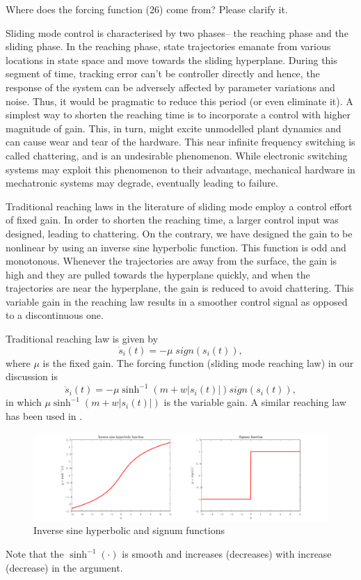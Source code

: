 \documentclass[10pt]{article}
\begin{document}
\begin{response}{Where does the forcing function (26) come from? Please clarify it.}

Sliding mode control is characterised by two phases-- the reaching phase and the sliding phase. In the reaching phase, state trajectories emanate from various locations in state space and move towards the sliding hyperplane. During this segment of time, tracking error can't be controller directly and hence, the response of the system can be adversely affected by parameter variations and noise. Thus, it would be pragmatic to reduce this period (or even eliminate it). A simplest way to shorten the reaching time is to incorporate a control with higher magnitude of gain. This, in turn, might excite unmodelled plant dynamics and can cause wear and tear of the hardware. This near infinite frequency switching is called chattering, and is an undesirable phenomenon. While electronic switching systems may exploit this phenomenon to their advantage, mechanical hardware in mechatronic systems may degrade, eventually leading to failure. 

Traditional reaching laws in the literature of sliding mode employ a control effort of fixed gain. In order to shorten the reaching time, a larger control input was designed, leading to chattering. On the contrary, we have designed the gain to be nonlinear by using an inverse sine hyperbolic function. This function is odd and monotonous. Whenever the trajectories are away from the surface, the gain is high and they are pulled towards the hyperplane quickly, and when the trajectories are near the hyperplane, the gain is reduced to avoid chattering. This variable gain in the reaching law results in a smoother control signal as opposed to a discontinuous one.

Traditional reaching law is given by
\begin{equation}\label{sdotold}
\dot{s}_i(t) = -\mu \; sign(s_i(t)),
\end{equation}
where $\mu$ is the fixed gain. The forcing function (sliding mode reaching law) in our discussion is
\begin{equation}\label{sdot}
\dot{s}_i(t) = -\mu \sinh^{-1}(m + w|s_i(t)|) sign(s_i(t)),
\end{equation}
in which $\mu \sinh^{-1}(m + w|s_i(t)|)$ is the variable gain. A similar reaching law has been used in \cite{6512130,Sinha2016,Majumder2018155}.
\begin{figure}[h!]
\includegraphics[width=\textwidth]{sinhandsign.pdf}\caption{Inverse sine hyperbolic and signum functions}
\end{figure}


Note that the $\sinh^{-1}(\cdot)$ is smooth and increases (decreases) with increase (decrease) in the argument.
\end{response}
\end{document}
